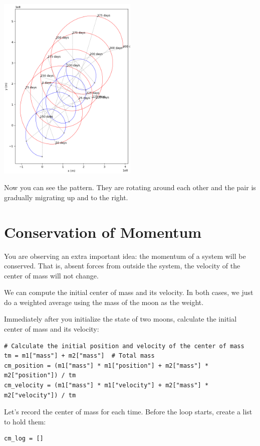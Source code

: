 \includegraphics[width=0.5\textwidth]{plotmoons_03.png}

Now you can see the pattern. They are rotating around each other and the pair is gradually migrating
up and to the right.

\section{Conservation of Momentum}

You are observing an extra important idea: the momentum of a system will be conserved. That is,  absent forces from outside the system,  the velocity of the center of mass will not change.

We can compute the initial center of mass and its velocity.   In both cases,  we just do a weighted average using the mass of the moon as the weight. 

Immediately after you initialize the state of two moons,  calculate the initial center of mass and its velocity:
\begin{verbatim}
# Calculate the initial position and velocity of the center of mass
tm = m1["mass"] + m2["mass"]  # Total mass
cm_position = (m1["mass"] * m1["position"] + m2["mass"] * m2["position"]) / tm
cm_velocity = (m1["mass"] * m1["velocity"] + m2["mass"] * m2["velocity"]) / tm
\end{verbatim}

Let's record the center of mass for each time.   Before the loop starts,  create a list to hold them:

\begin{verbatim}
cm_log = []
\end{verbatim}

